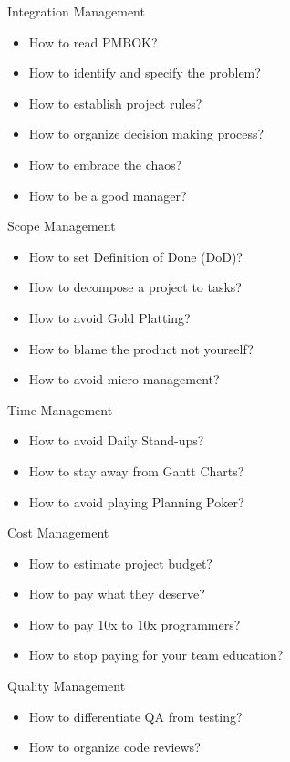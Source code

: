 \documentclass[nobrand,anonymous,nodate,nosecurity]{huawei}
\begin{document}
{
\begin{lectures}
\item Integration Management
    \begin{itemize}
    \item How to read PMBOK?
    \item How to identify and specify the problem?
    \item How to establish project rules?
    \item How to organize decision making process?
    \item How to embrace the chaos?
    \item How to be a good manager?
    \end{itemize}
\item Scope Management
    \begin{itemize}
    \item How to set Definition of Done (DoD)?
    \item How to decompose a project to tasks?
    \item How to avoid Gold Platting?
    \item How to blame the product not yourself?
    \item How to avoid micro-management?
    \end{itemize}
\item Time Management
    \begin{itemize}
    \item How to avoid Daily Stand-ups?
    \item How to stay away from Gantt Charts?
    \item How to avoid playing Planning Poker?
    \end{itemize}
\item Cost Management
    \begin{itemize}
    \item How to estimate project budget?
    \item How to pay what they deserve?
    \item How to pay 10x to 10x programmers?
    \item How to stop paying for your team education?
    \end{itemize}
\item Quality Management
    \begin{itemize}
    \item How to differentiate QA from testing?
    \item How to organize code reviews?

\end{itemize}
\end{lectures}}
\end{document}
